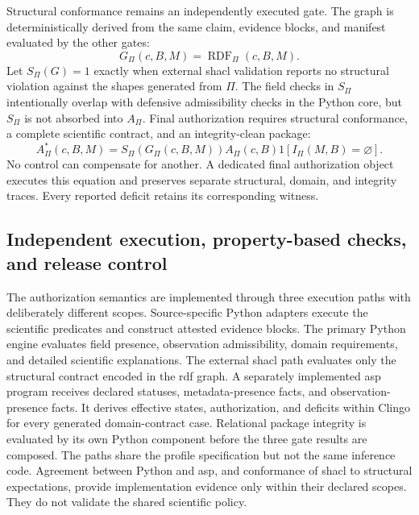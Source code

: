 Structural conformance remains an independently executed gate. The graph is deterministically derived from the same claim, evidence blocks, and manifest evaluated by the other gates:
\begin{equation}
G_{\Pi}(c,B,M)=\operatorname{RDF}_{\Pi}(c,B,M).
\label{eq:package-rdf}
\end{equation}
Let $S_{\Pi}(G)=1$ exactly when external \ac{shacl} validation reports no structural violation against the shapes generated from $\Pi$. The field checks in $S_{\Pi}$ intentionally overlap with defensive admissibility checks in the Python core, but $S_{\Pi}$ is not absorbed into $A_{\Pi}$. Final authorization requires structural conformance, a complete scientific contract, and an integrity-clean package:
\begin{equation}
A^{*}_{\Pi}(c,B,M)=S_{\Pi}(G_{\Pi}(c,B,M))A_{\Pi}(c,B)
\mathrm{1}[I_{\Pi}(M,B)=\varnothing].
\label{eq:integrity-authorization}
\end{equation}
No control can compensate for another. A dedicated final authorization object executes this equation and preserves separate structural, domain, and integrity traces. Every reported deficit retains its corresponding witness.

\subsection{Independent execution, property-based checks, and release control}
\label{subsec:execution-release}

The authorization semantics are implemented through three execution paths with deliberately different scopes. Source-specific Python adapters execute the scientific predicates and construct attested evidence blocks. The primary Python engine evaluates field presence, observation admissibility, domain requirements, and detailed scientific explanations. The external \ac{shacl} path evaluates only the structural contract encoded in the \ac{rdf} graph. A separately implemented \ac{asp} program receives declared statuses, metadata-presence facts, and observation-presence facts. It derives effective states, authorization, and deficits within Clingo for every generated domain-contract case. Relational package integrity is evaluated by its own Python component before the three gate results are composed. The paths share the profile specification but not the same inference code. Agreement between Python and \ac{asp}, and conformance of \ac{shacl} to structural expectations, provide implementation evidence only within their declared scopes. They do not validate the shared scientific policy.

